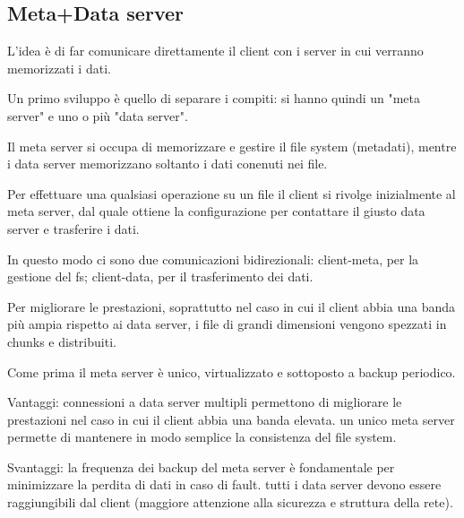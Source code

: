 \documentclass{article}
\begin{document}
\subsection{Meta+Data server}

L'idea è di far comunicare direttamente il client con i server in cui verranno memorizzati i dati. 

Un primo sviluppo è quello di separare i compiti: si hanno quindi un "meta server" e uno o più "data server". 

Il meta server si occupa di memorizzare e gestire il file system (metadati), mentre i data server memorizzano soltanto i dati conenuti nei file. 

Per effettuare una qualsiasi operazione su un file il client si rivolge inizialmente al meta server, dal quale ottiene la configurazione per contattare il giusto data server e trasferire i dati. 

In questo modo ci sono due comunicazioni bidirezionali: client-meta, per la gestione del fs; client-data, per il trasferimento dei dati.

Per migliorare le prestazioni, soprattutto nel caso in cui il client abbia una banda più ampia rispetto ai data server, i file di grandi dimensioni vengono spezzati in chunks e distribuiti. 

Come prima il meta server è unico, virtualizzato e sottoposto a backup periodico. 

Vantaggi: connessioni a data server multipli permettono di migliorare le prestazioni nel caso in cui il client abbia una banda elevata. un unico meta server permette di mantenere in modo semplice la consistenza del file system. 

Svantaggi: la frequenza dei backup del meta server è fondamentale per minimizzare la perdita di dati in caso di fault. tutti i data server devono essere raggiungibili dal client (maggiore attenzione alla sicurezza e struttura della rete). 
\end{document}
